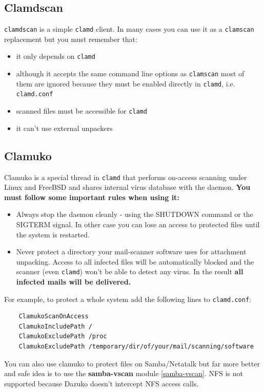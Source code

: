 \documentclass[a4paper,titlepage,12pt]{article}
\begin{document}
    \subsection{Clam\textbf{d}scan}
    \verb+clamdscan+ is a simple \verb+clamd+ client. In many cases you can
    use it as a \verb+clamscan+ replacement but you must remember that:
    \begin{itemize}
	\item it only depends on \verb+clamd+
	\item although it accepts the same command line options as
	      \verb+clamscan+ most of them are ignored because they must be
	      enabled directly in \verb+clamd+, i.e. \verb+clamd.conf+
	\item scanned files must be accessible for \verb+clamd+
	\item it can't use external unpackers
    \end{itemize}

    \subsection{Clamuko}\label{clamuko}
    Clamuko is a special thread in \verb+clamd+ that performs on-access
    scanning under Linux and FreeBSD and shares internal virus database
    with the daemon. \textbf{You must follow some important rules when
    using it:}
    \begin{itemize}
	\item Always stop the daemon cleanly - using the SHUTDOWN command or
	      the\\ SIGTERM signal. In other case you can lose an access
	      to protected files until the system is restarted.
	\item Never protect a directory your mail-scanner software
	      uses for attachment unpacking. Access to all infected
	      files will be automatically blocked and the scanner (even
	      \verb+clamd+) won't be able to detect any virus. In the result
	      \textbf{all infected mails will be delivered.}
    \end{itemize}
    For example, to protect a whole system add the following lines to
    \verb+clamd.conf+:
    \begin{verbatim}
	ClamukoScanOnAccess
	ClamukoIncludePath /
	ClamukoExcludePath /proc
	ClamukoExcludePath /temporary/dir/of/your/mail/scanning/software
    \end{verbatim}
    You can also use clamuko to protect files on Samba/Netatalk but far
    more better and safe idea is to use the \textbf{samba-vscan} module
    \ref{samba-vscan}. NFS is not supported because Dazuko doesn't intercept
    NFS access calls.
\end{document}
